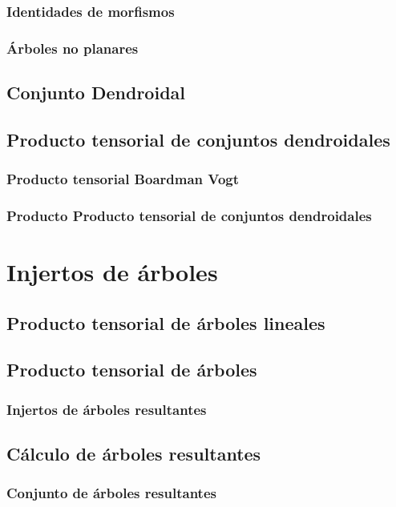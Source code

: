 \documentclass[11pt,a4paper,openright,oneside]{article}
\numberwithin{equation}{section}
\theoremstyle{definition}
\begin{document}
\subsubsection{Identidades de morfismos}
\subsubsection{\'Arboles no planares}
\subsection{Conjunto Dendroidal}
\subsection{Producto tensorial de conjuntos dendroidales}
\subsubsection{Producto tensorial Boardman Vogt}
\subsubsection{Producto Producto tensorial de conjuntos dendroidales}
\newpage


\section{Injertos de \'arboles}
\subsection{Producto tensorial de \'arboles lineales}
\subsection{Producto tensorial de \'arboles}
\subsubsection{Injertos de \'arboles resultantes}
\subsection{C\'alculo de \'arboles resultantes}
\subsubsection{Conjunto de \'arboles resultantes}
\end{document}
